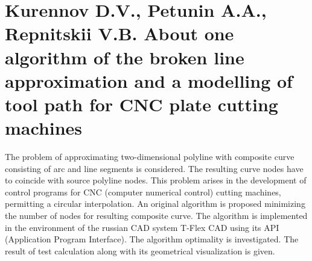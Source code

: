 \part{Kurennov D.V., Petunin A.A., Repnitskii V.B.
About one algorithm of the broken line approximation and a modelling of tool path
for CNC plate cutting machines}

The problem of approximating two-dimensional polyline
with composite curve consisting of arc and line segments
is considered.
The resulting curve nodes have to coincide with source polyline nodes.
This problem arises in the development of control programs
for CNC (computer numerical control) cutting machines,
permitting a circular interpolation.
An original algorithm is proposed
minimizing the number of nodes for resulting composite curve.
The algorithm is implemented in the environment of the russian CAD system 
T-Flex CAD using its API (Application Program Interface).
The algorithm optimality is investigated.
The result of test calculation along with its geometrical visualization is given.
